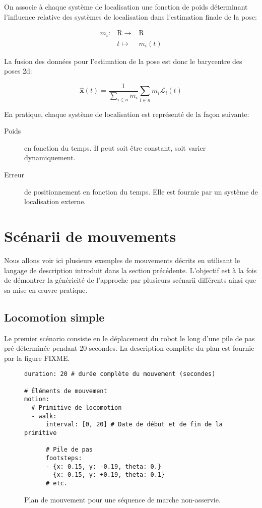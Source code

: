 On associe à chaque système de localisation une fonction de poids
déterminant l'influence relative des systèmes de localisation dans
l'estimation finale de la pose:

\begin{equation}
  \begin{array}{ccc}
    m_i : & \mathrm{R} \rightarrow & \mathrm{R}\\
    ~ & t \mapsto & m_i(t)
  \end{array}
\end{equation}

La fusion des données pour l'estimation de la pose est donc le
barycentre des poses 2d:

\begin{equation}
  \mathbf{\hat{x}}(t) = \frac{1}{\sum_{i \in n} m_i} \sum_{i \in n} m_i \mathcal{L}_i(t)
\end{equation}

En pratique, chaque système de localisation est représenté de la façon suivante:
\begin{description}
\item[Poids] en fonction du temps. Il peut soit être constant, soit
  varier dynamiquement.
\item[Erreur] de positionnement en fonction du temps. Elle est fournie
  par un système de localisation externe.
\end{description}


\section{Scénarii de mouvements}


Nous allons voir ici plusieurs exemples de mouvements décrits en
utilisant le langage de description introduit dans la section
précédente. L'objectif est à la fois de démontrer la généricité de
l'approche par plusieurs scénarii différents ainsi que sa mise en
\oe uvre pratique.


\subsection{Locomotion simple}

Le premier scénario consiste en le déplacement du robot le long d'une
pile de pas pré-déterminée pendant 20 secondes. La description
complète du plan est fournie par la figure FIXME.

\begin{figure}
  \begin{center}
\begin{verbatim}
duration: 20 # durée complète du mouvement (secondes)

# Éléments de mouvement
motion:
  # Primitive de locomotion
  - walk:
      interval: [0, 20] # Date de début et de fin de la primitive

      # Pile de pas
      footsteps:
      - {x: 0.15, y: -0.19, theta: 0.}
      - {x: 0.15, y: +0.19, theta: 0.1}
      # etc.
\end{verbatim}
  \end{center}
  \caption{Plan de mouvement pour une séquence de marche non-asservie.}
\end{figure}

